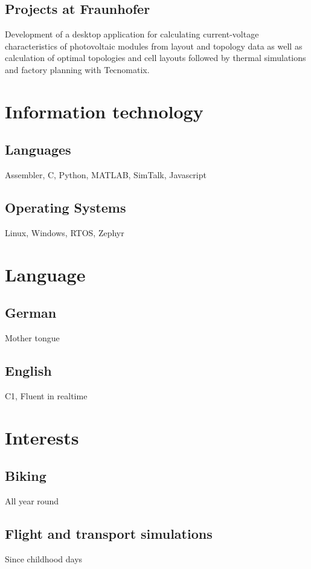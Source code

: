 \documentclass[10pt, a4paper, sans]{moderncv}
\begin{document}
\subsection{Projects at Fraunhofer}
Development of a desktop application for calculating current-voltage characteristics of photovoltaic modules from layout and topology data as well as calculation of optimal topologies and cell layouts
followed by thermal simulations and factory planning with Tecnomatix.

\section{Information technology}
\subsection*{Languages}
Assembler, C, Python, MATLAB, SimTalk, Javascript
\subsection*{Operating Systems}
Linux, Windows, RTOS, Zephyr

\section{Language}
\subsection{German}
Mother tongue
\subsection{English}
C1, Fluent in realtime

\section{Interests}
\subsection*{Biking}
All year round
\subsection*{Flight and transport simulations}
Since childhood days
\end{document}
